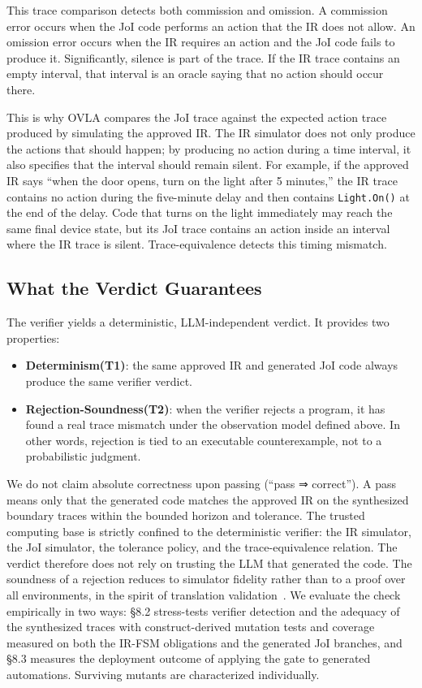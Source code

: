 \documentclass[sigconf,nonacm,anonymous,review]{acmart}
\begin{document}
This trace comparison detects both commission and omission. A commission error occurs when the JoI code performs an action that the IR does not allow. An omission error occurs when the IR requires an action and the JoI code fails to produce it. %
Significantly, silence is part of the trace. If the IR trace contains an empty interval, that interval is an oracle saying that no action should occur there.

This is why OVLA compares the JoI trace against the expected action trace produced by simulating the approved IR. The IR simulator does not only produce the actions that should happen; by producing no action during a time interval, it also specifies that the interval should remain silent. For example, if the approved IR says ``when the door opens, turn on the light after 5 minutes,'' the IR trace contains no action during the five-minute delay and then contains \texttt{Light.On()} at the end of the delay. Code that turns on the light immediately may reach the same final device state, but its JoI trace contains an action inside an interval where the IR trace is silent. Trace-equivalence detects this timing mismatch.

\subsection{What the Verdict Guarantees}

The verifier yields a deterministic, LLM-independent verdict. It provides two properties:
\begin{itemize}
\item \textbf{Determinism(T1)}: the same approved IR and generated JoI code always produce the same verifier verdict. 
\item \textbf{Rejection-Soundness(T2)}: when the verifier rejects a program, it has found a real trace mismatch under the observation model defined above. In other words, rejection is tied to an executable counterexample, not to a probabilistic judgment.
\end{itemize}

We do not claim absolute correctness upon passing (``pass ⇒ correct''). A pass means only that the generated code matches the approved IR on the synthesized boundary traces within the bounded horizon and tolerance. The trusted computing base is strictly confined to the deterministic verifier: the IR simulator, the JoI simulator, the tolerance policy, and the trace-equivalence relation. The verdict therefore does not rely on trusting the LLM that generated the code. The soundness of a rejection reduces to simulator fidelity rather than to a proof over all environments, in the spirit of translation validation~\cite{translationvalidation,alive2}. We evaluate the check empirically in two ways: \S8.2 stress-tests verifier detection and the adequacy of the synthesized traces with construct-derived mutation tests and coverage measured on both the IR-FSM obligations and the generated JoI branches, and \S8.3 measures the deployment outcome of applying the gate to generated automations. Surviving mutants are characterized individually.
\end{document}

